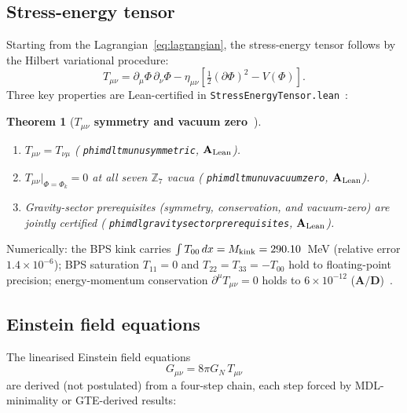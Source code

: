 \documentclass[11pt]{article}
\newtheorem{theorem}{Theorem}[section]
\theoremstyle{remark}
\newcommand{\ZS}{\mathbb{Z}_7}
\newcommand{\lean}[1]{%
  \penalty-100
  \begingroup\def\_{\textunderscore\allowbreak}\texttt{#1}\endgroup}
\newcommand{\Mkink}{M_{\rm kink}}
\newcommand{\CatAL}{\ensuremath{\textbf{A}_{\rm Lean}}}
\newcommand{\CatAD}{\textbf{A/D}}
\begin{document}
\subsection{Stress-energy tensor}

Starting from the Lagrangian~\eqref{eq:lagrangian}, the stress-energy
tensor follows by the Hilbert variational procedure:
\begin{equation}
  T_{\mu\nu} = \partial_\mu\Phi\,\partial_\nu\Phi
               - \eta_{\mu\nu}\!\left[\tfrac{1}{2}(\partial\Phi)^2 - V(\Phi)\right].
  \label{eq:tmunu}
\end{equation}
Three key properties are Lean-certified in
\lean{StressEnergyTensor.lean}~\cite{SpivackPhiMDLGravity}:

\begin{theorem}[\textbf{$T_{\mu\nu}$ symmetry and vacuum zero~\cite{SpivackPhiMDLGravity}}]
\label{thm:tmunu}
\begin{enumerate}[noitemsep,label=(\alph*)]
\item $T_{\mu\nu} = T_{\nu\mu}$ \quad (\lean{phimdl\_tmunu\_symmetric}, $\CatAL$).
\item $T_{\mu\nu}\big|_{\Phi=\Phi_k} = 0$ at all seven $\ZS$ vacua
  \quad (\lean{phimdl\_tmunu\_vacuum\_zero}, $\CatAL$).
\item Gravity-sector prerequisites (symmetry, conservation, and vacuum-zero)
  are jointly certified \quad (\lean{phimdl\_gravity\_sector\_prerequisites}, $\CatAL$).
\end{enumerate}
\end{theorem}

\noindent
Numerically: the BPS kink carries $\int T_{00}\,dx = \Mkink = 290.10$~MeV
(relative error $1.4\times10^{-6}$); BPS saturation $T_{11}=0$ and
$T_{22}=T_{33}=-T_{00}$ hold to floating-point precision; energy-momentum
conservation $\partial^\mu T_{\mu\nu}=0$ holds to $6\times10^{-12}$
($\CatAD$)~\cite{SpivackPhiMDLGravity}.

\subsection{Einstein field equations}

The linearised Einstein field equations
\begin{equation}
  G_{\mu\nu} = 8\pi G_N\, T_{\mu\nu}
  \label{eq:efe}
\end{equation}
are derived (not postulated) from a four-step chain, each step
forced by MDL-minimality or GTE-derived results:
\end{document}
